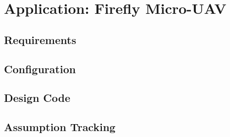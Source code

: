 \chapter{Application: Firefly Micro-UAV}
\label{chapter:firefly}

\section{Requirements}

\section{Configuration}

\section{Design Code}

%
%

\section{Assumption Tracking}